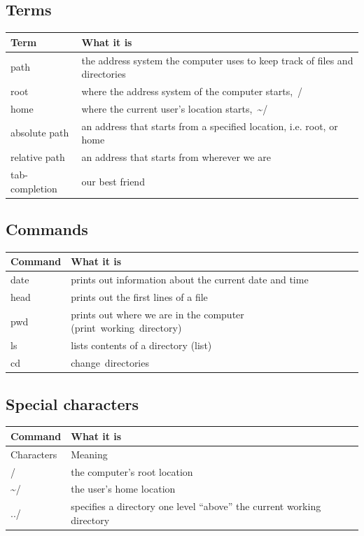 \documentclass[
]{book}
\begin{document}
\hypertarget{terms}{%
\subsection{Terms}\label{terms}}

\begin{longtable}{ll}
\toprule
\textbf{Term} & \textbf{What it is}\\
\midrule
path & the address system the computer uses to keep track of files and directories\\
root & where the address system of the computer starts, /\\
home & where the current user’s location starts, \textasciitilde{}/\\
absolute path & an address that starts from a specified location, i.e. root, or home\\
relative path & an address that starts from wherever we are\\
\addlinespace
tab-completion & our best friend\\
\bottomrule
\end{longtable}

\hypertarget{commands}{%
\subsection{Commands}\label{commands}}

\begin{longtable}{ll}
\toprule
\textbf{Command} & \textbf{What it is}\\
\midrule
date & prints out information about the current date and time\\
head & prints out the first lines of a file\\
pwd & prints out where we are in the computer (print working directory)\\
ls & lists contents of a directory (list)\\
cd & change directories\\
\bottomrule
\end{longtable}

\hypertarget{special-characters}{%
\subsection{Special characters}\label{special-characters}}

\begin{longtable}{ll}
\toprule
\textbf{Command} & \textbf{What it is}\\
\midrule
Characters & Meaning\\
/ & the computer’s root location\\
\textasciitilde{}/ & the user’s home location\\
../ & specifies a directory one level “above” the current working directory\\
\bottomrule
\end{longtable}
\end{document}

